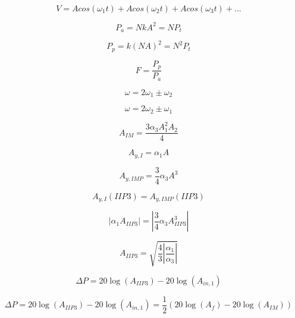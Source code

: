 \begin{equation}
	V = Acos(\omega_1 t) + Acos(\omega_2t)+Acos(\omega_3t)+...
\end{equation}

\begin{equation}
	P_a= NkA^2 = NP_t 
\end{equation}

\begin{equation}
 	P_p= k (NA)^2= N^2P_t
 \end{equation} 

\begin{equation}
	F= \frac{P_p}{P_a}
\end{equation}

\begin{equation}
	\omega = 2\omega_1 \pm \omega_2
\end{equation}

\begin{equation}
	\omega = 2\omega_2 \pm \omega_1
\end{equation}

\begin{equation}
A_{IM} = \frac{3\alpha_3A_1^2A_2}{4}
\end{equation}

\begin{equation}
	A_{y,I} = \alpha_1A
\end{equation}

\begin{equation}
	A_{y,IMP} = \frac{3}{4}\alpha_3 A^3
\end{equation}

\begin{equation}
	A_{y,I}(IIP3) = A_{y,IMP}(IIP3)
\end{equation}

\begin{equation}
	|\alpha_1A_{IIP3}| = |\frac{3}{4}\alpha_3A_{IIP3}^3|
\end{equation}

\begin{equation}
	A_{IIP3} = \sqrt{\frac{4}{3}|\frac{\alpha_1}{\alpha_3}|}
\end{equation}

\begin{equation}
	\Delta P = 20\log(A_{IIP3}) - 20\log(A_{in,1})
\end{equation}

\begin{equation}
	\Delta P = 20\log(A_{IIP3}) - 20\log(A_{in,1}) = \frac{1}{2}(20\log(A_f) - 20\log(A_{IM}))
\end{equation}


